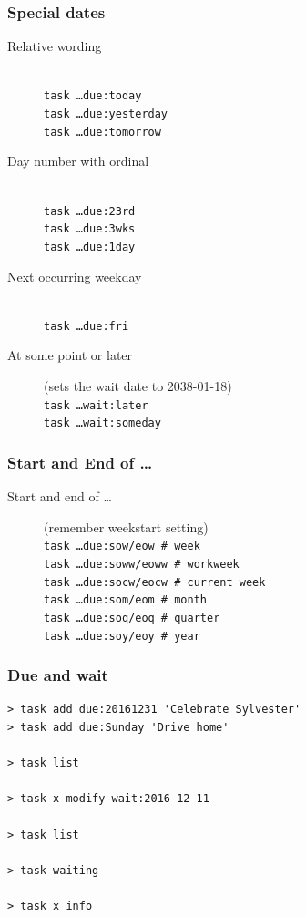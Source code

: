 \documentclass[t,handout,aspectratio=169]{beamer}
\begin{document}
\begin{frame}[fragile]\frametitle{Special dates}
    \begin{description}
    \item[Relative wording] \hfill \\
        \texttt{task \ldots due:today} \\
        \texttt{task \ldots due:yesterday} \\
        \texttt{task \ldots due:tomorrow} \\
    \item[Day number with ordinal] \hfill \\
        \texttt{task \ldots due:23rd} \\
        \texttt{task \ldots due:3wks} \\
        \texttt{task \ldots due:1day} \\
        \item[Next occurring weekday] \hfill \\
            \texttt{task \ldots due:fri}
    \item[At some point or later] (sets the wait date to 2038-01-18) \hfill \\
        \texttt{task \ldots wait:later} \\
        \texttt{task \ldots wait:someday}
    \end{description}
\end{frame}

\begin{frame}[fragile]\frametitle{Start and End of \ldots}
    \vfill
    \begin{description}
        \item[Start and end of \ldots] (remember weekstart setting) \hfill \\
            \texttt{task \ldots due:sow/eow \# week} \\
            \texttt{task \ldots due:soww/eoww \# workweek} \\
            \texttt{task \ldots due:socw/eocw \# current week} \\
            \texttt{task \ldots due:som/eom \# month} \\
            \texttt{task \ldots due:soq/eoq \# quarter} \\
            \texttt{task \ldots due:soy/eoy \# year} \\
    \end{description}
\end{frame}

\begin{frame}[fragile]\frametitle{Due and wait}
    \vfill
    \begin{lstlisting}
> task add due:20161231 'Celebrate Sylvester'
> task add due:Sunday 'Drive home'

> task list

> task x modify wait:2016-12-11

> task list

> task waiting

> task x info\end{lstlisting}
\end{frame}
\end{document}
